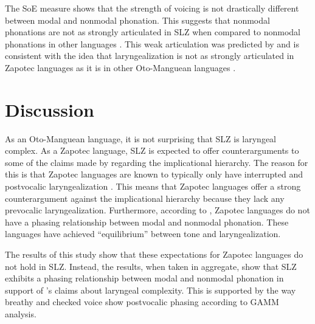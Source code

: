 The SoE measure shows that the strength of voicing is not drastically different between modal and nonmodal phonation. This suggests that nonmodal phonations are not as strongly articulated in SLZ when compared to nonmodal phonations in other languages \citep[e.g.,][]{garellekVoicingGlottalConsonants2021,garellekMarginsPhonologyPhonetics2025,wellerInteractionsToneGlottalization2023,wellerLexicalToneVowel2023,wellerVoiceQualityTone2024}. This weak articulation was predicted by \citeauthor{silvermanLaryngealComplexityOtomanguean1997} and is consistent with the idea that laryngealization is not as strongly articulated in Zapotec languages as it is in other Oto-Manguean languages \citep{herrerazendejasAmuzgoZapotecTwo2000}.

\section{Discussion}\label{sec:discussion_of_lc}

As an Oto-Manguean language, it is not surprising that SLZ is laryngeal complex. As a Zapotec language, SLZ is expected to offer counterarguments to some of the claims made by \citet{silvermanLaryngealComplexityOtomanguean1997,silvermanPhasingRecoverability1997} regarding the implicational hierarchy. The reason for this is that Zapotec languages are known to typically only have interrupted and postvocalic laryngealization \citep{arellanesarellanesSistemaFonologicoPropiedades2009,arellanesarellanesDosGradosLaringizacion2010,ariza-garciaPhonationTypesTones2018,avelinoTopicsYalalagZapotec2004,avelinoAcousticElectroglottographicAnalyses2010,espositoSantaAnaValle2004,espositoVariationContrastivePhonation2010}. This means that Zapotec languages offer a strong counterargument against the implicational hierarchy because they lack any prevocalic laryngealization. Furthermore, according to \citet{herrerazendejasAmuzgoZapotecTwo2000}, Zapotec languages do not have a phasing relationship between modal and nonmodal phonation. These languages have achieved ``equilibrium'' between tone and laryngealization. 

The results of this study show that these expectations for Zapotec languages do not hold in SLZ. Instead, the results, when taken in aggregate, show that SLZ exhibits a phasing relationship between modal and nonmodal phonation in support of \citeauthor{silvermanLaryngealComplexityOtomanguean1997}'s \citeyear{silvermanLaryngealComplexityOtomanguean1997,silvermanPhasingRecoverability1997} claims about laryngeal complexity. This is supported by the way breathy and checked voice show postvocalic phasing according to GAMM analysis.


